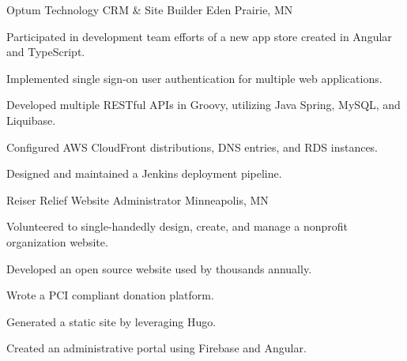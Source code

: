 \begin{cventries}
    \cventry
    {Optum Technology} %
    {CRM \& Site Builder} %
    {Eden Prairie, MN} %
    {} %
    {
    \begin{cvitems} %
        \item {Participated in development team efforts of a new app store created in Angular and TypeScript.}
        \item {Implemented single sign-on user authentication for multiple web applications.}
        \item {Developed multiple RESTful APIs in Groovy, utilizing Java Spring, MySQL, and Liquibase.}
        \item {Configured AWS CloudFront distributions, DNS entries, and RDS instances.}
        \item {Designed and maintained a Jenkins deployment pipeline.}
    \end{cvitems}
    }

    \cventry
    {Reiser Relief} %
    {Website Administrator} %
    {Minneapolis, MN} %
    {} %
    {
    \begin{cvitems} %
        \item {Volunteered to single‑handedly design, create, and manage a nonprofit organization website.}
        \item {Developed an open source website used by thousands annually.}
        \item {Wrote a PCI compliant donation platform.}
        \item {Generated a static site by leveraging Hugo.}
        \item {Created an administrative portal using Firebase and Angular.}
    \end{cvitems}
    }

\end{cventries}
